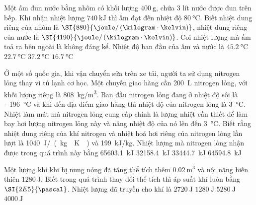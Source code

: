 \begin{ex}
	Một ấm đun nước bằng nhôm có khối lượng $\SI{400}{\gram}$, chứa 3 lít nước được đun trên bếp. Khi nhận nhiệt lượng $\SI{740}{\kilo\joule}$ thì ấm đạt đến nhiệt độ $\SI{80}{\celsius}$. Biết nhiệt dung riêng của nhôm là $\SI{880}{\joule/\left(\kilogram\cdot\kelvin\right)}$, nhiệt dung riêng của nước là $\SI{4190}{\joule/\left(\kilogram\cdot\kelvin\right)}$. Coi nhiệt lượng mà ấm toả ra bên ngoài là không đáng kể. Nhiệt độ ban đầu của ấm và nước là
	\choice
	{$\SI{45.2}{\celsius}$}
	{\True $\SI{22.7}{\celsius}$}
	{$\SI{37.2}{\celsius}$}
	{$\SI{16.7}{\celsius}$}
\end{ex}
\begin{ex}
	Ở một số quốc gia, khi vận chuyển sữa trên xe tải, người ta sử dụng nitrogen lỏng thay vì tủ lạnh cơ học. Một chuyến giao hàng cần \SI{200}{\liter} nitrogen lỏng, với khối lượng riêng là \SI{808}{\kilogram/\meter^3}. Ban đầu nitrogen lỏng đang ở nhiệt độ sôi là \SI{-196}{\celsius} và khi đến địa điểm giao hàng thì nhiệt độ của nitrogen lỏng là \SI{3}{\celsius}. Nhiệt làm mát mà nitrogen lỏng cung cấp chính là lượng nhiệt cần thiết để làm bay hơi lượng nitrogen lỏng này và nâng nhiệt độ của nó lên đến \SI{3}{\celsius}. Biết rằng nhiệt dung riêng của khí nitrogen và nhiệt hoá hơi riêng của nitrogen lỏng lần lượt là \SI{1040}{\joule/\left(\kilogram\cdot\kelvin\right)} và \SI{199}{\kilo\joule/\kilogram}. Nhiệt lượng mà nitrogen lỏng nhận được trong quá trình này bằng
	\choice
	{\True \SI{65603.1}{\kilo\joule}}
	{\SI{32158.4}{\kilo\joule}}
	{\SI{33444.7}{\kilo\joule}}
	{\SI{64594.8}{\kilo\joule}}
	\loigiai{}
\end{ex}
\begin{ex}
	Một lượng khí khi bị nung nóng đã tăng thể tích thêm $\SI{0.02}{\meter^3}$ và nội năng biến thiên $\SI{1280}{\joule}$. Biết trong quá trình thay đổi thể tích thì áp suất khí luôn bằng $\SI{2E5}{\pascal}$. Nhiệt lượng đã truyền cho khí là
	\choice
	{$\SI{2720}{\joule}$}
	{$\SI{1280}{\joule}$}
	{\True $\SI{5280}{\joule}$}
	{$\SI{4000}{\joule}$}
\end{ex}

